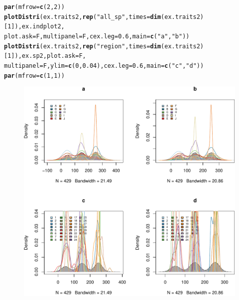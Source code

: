 \documentclass[12pt]{article}\usepackage[]{graphicx}\usepackage[]{color}
\makeatletter
\def\maxwidth{ %
  \ifdim\Gin@nat@width>\linewidth
    \linewidth
  \else
    \Gin@nat@width
  \fi
}
\newcommand{\hlnum}[1]{\textcolor[rgb]{0.686,0.059,0.569}{#1}}%
\newcommand{\hlstr}[1]{\textcolor[rgb]{0.192,0.494,0.8}{#1}}%
\newcommand{\hlstd}[1]{\textcolor[rgb]{0.345,0.345,0.345}{#1}}%
\newcommand{\hlkwc}[1]{\textcolor[rgb]{0.333,0.667,0.333}{#1}}%
\newcommand{\hlkwd}[1]{\textcolor[rgb]{0.737,0.353,0.396}{\textbf{#1}}}%
\newenvironment{kframe}{%
 \def\at@end@of@kframe{}%
 \ifinner\ifhmode%
  \def\at@end@of@kframe{\end{minipage}}%
  \begin{minipage}{\columnwidth}%
 \fi\fi%
 \def\FrameCommand##1{\hskip\@totalleftmargin \hskip-\fboxsep
 \colorbox{shadecolor}{##1}\hskip-\fboxsep
     \hskip-\linewidth \hskip-\@totalleftmargin \hskip\columnwidth}%
 \MakeFramed {\advance\hsize-\width
   \@totalleftmargin\z@ \linewidth\hsize
   \@setminipage}}%
 {\par\unskip\endMakeFramed%
 \at@end@of@kframe}
\newenvironment{knitrout}{}{} %
\makeatother
\begin{document}
\begin{knitrout}\small
{}\color{fgcolor}\begin{kframe}
\begin{alltt}
\hlkwd{par}\hlstd{(}\hlkwc{mfrow}\hlstd{=}\hlkwd{c}\hlstd{(}\hlnum{2}\hlstd{,} \hlnum{2}\hlstd{))}
\hlkwd{plotDistri}\hlstd{(ex.traits2,} \hlkwd{rep}\hlstd{(}\hlstr{"all_sp"}\hlstd{,} \hlkwc{times} \hlstd{=} \hlkwd{dim}\hlstd{(ex.traits2)[}\hlnum{1}\hlstd{]), ex.indplot2,}
           \hlkwc{plot.ask} \hlstd{= F,} \hlkwc{multipanel} \hlstd{= F,} \hlkwc{cex.leg} \hlstd{=} \hlnum{0.6}\hlstd{,} \hlkwc{main}\hlstd{=} \hlkwd{c}\hlstd{(}\hlstr{"a"}\hlstd{,} \hlstr{"b"}\hlstd{))}
\hlkwd{plotDistri}\hlstd{(ex.traits2,} \hlkwd{rep}\hlstd{(}\hlstr{"region"}\hlstd{,} \hlkwc{times} \hlstd{=} \hlkwd{dim}\hlstd{(ex.traits2)[}\hlnum{1}\hlstd{]), ex.sp2,} \hlkwc{plot.ask} \hlstd{= F,}
           \hlkwc{multipanel} \hlstd{= F,} \hlkwc{ylim} \hlstd{=} \hlkwd{c}\hlstd{(}\hlnum{0}\hlstd{,}\hlnum{0.04}\hlstd{),} \hlkwc{cex.leg} \hlstd{=} \hlnum{0.6}\hlstd{,} \hlkwc{main}\hlstd{=} \hlkwd{c}\hlstd{(}\hlstr{"c"}\hlstd{,} \hlstr{"d"}\hlstd{))}
\hlkwd{par}\hlstd{(}\hlkwc{mfrow}\hlstd{=}\hlkwd{c}\hlstd{(}\hlnum{1}\hlstd{,} \hlnum{1}\hlstd{))}
\end{alltt}
\end{kframe}\begin{figure}

{\centering \includegraphics[width=\maxwidth]{figure/typical_result_internal_filtering1-1} 

}
\end{figure}
\end{knitrout}
\end{document}
